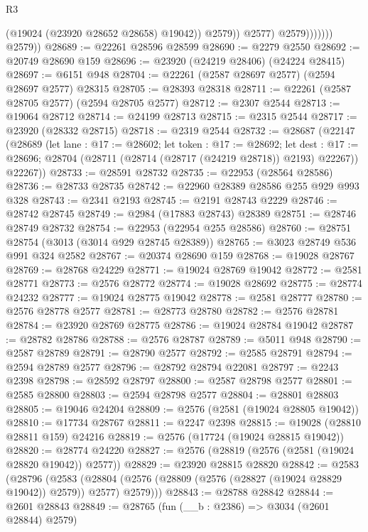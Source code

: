 \begin{lexlean}{R3}
\begin{coremodule}
                              (@19024 (@23920 @28652 @28658) @19042))
                            @2579))
                        @2577)
                      @2579)))))))
        @2579))
@28689 := @22261 @28596 @28599
@28690 := @2279 @2550
@28692 := @20749 @28690 @159
@28696 := @23920 (@24219 @28406) (@24224 @28415)
@28697 := @6151 @948
@28704 := @22261 (@2587 @28697 @2577) (@2594 @28697 @2577) @28315
@28705 := @28393 @28318
@28711 := @22261 (@2587 @28705 @2577) (@2594 @28705 @2577)
@28712 := @2307 @2544
@28713 := @19064 @28712
@28714 := @24199 @28713
@28715 := @2315 @2544
@28717 := @23920 (@28332 @28715)
@28718 := @2319 @2544
@28732 := @28687
    (@22147
      (@28689
        (let lane : @17 := @28602;
        let token : @17 := @28692;
        let dest : @17 := @28696; @28704 (@28711 (@28714 (@28717 (@24219 @28718)) @2193) @22267))
        @22267))
@28733 := @28591 @28732
@28735 := @22953 (@28564 @28586)
@28736 := @28733 @28735
@28742 := @22960 @28389 @28586 @255 @929 @993 @328
@28743 := @2341 @2193
@28745 := @2191 @28743 @2229
@28746 := @28742 @28745
@28749 := @2984 (@17883 @28743) @28389
@28751 := @28746 @28749 @28732
@28754 := @22953 (@22954 @255 @28586)
@28760 := @28751 @28754 (@3013 (@3014 @929 @28745 @28389))
@28765 := @3023 @28749 @536 @991 @324 @2582
@28767 := @20374 @28690 @159
@28768 := @19028 @28767
@28769 := @28768 @24229
@28771 := @19024 @28769 @19042
@28772 := @2581 @28771
@28773 := @2576 @28772
@28774 := @19028 @28692
@28775 := @28774 @24232
@28777 := @19024 @28775 @19042
@28778 := @2581 @28777
@28780 := @2576 @28778 @2577
@28781 := @28773 @28780
@28782 := @2576 @28781
@28784 := @23920 @28769 @28775
@28786 := @19024 @28784 @19042
@28787 := @28782 @28786
@28788 := @2576 @28787
@28789 := @5011 @948
@28790 := @2587 @28789
@28791 := @28790 @2577
@28792 := @2585 @28791
@28794 := @2594 @28789 @2577
@28796 := @28792 @28794 @22081
@28797 := @2243 @2398
@28798 := @28592 @28797
@28800 := @2587 @28798 @2577
@28801 := @2585 @28800
@28803 := @2594 @28798 @2577
@28804 := @28801 @28803
@28805 := @19046 @24204
@28809 := @2576 (@2581 (@19024 @28805 @19042))
@28810 := @17734 @28767
@28811 := @2247 @2398
@28815 := @19028 (@28810 @28811 @159) @24216
@28819 := @2576 (@17724 (@19024 @28815 @19042))
@28820 := @28774 @24220
@28827 := @2576 (@28819 (@2576 (@2581 (@19024 @28820 @19042)) @2577))
@28829 := @23920 @28815 @28820
@28842 := @2583
    (@28796
      (@2583 (@28804 (@2576 (@28809 (@2576 (@28827 (@19024 @28829 @19042)) @2579)) @2577) @2579)))
@28843 := @28788 @28842
@28844 := @2601 @28843
@28849 := @28765 (fun (__b : @2386) => @3034 (@2601 @28844) @2579)

\end{coremodule}
\end{lexlean}
